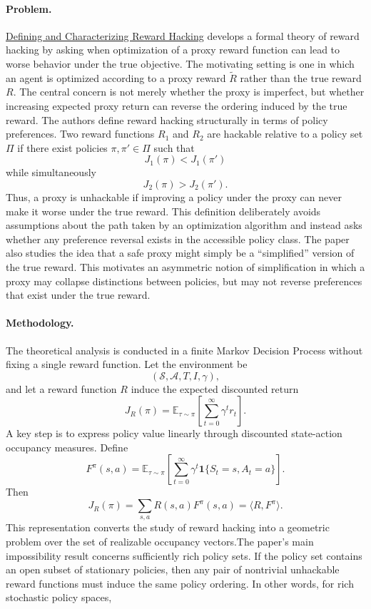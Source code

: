 \documentclass[11pt]{article}
\begin{document}
\paragraph{Problem.}
\href{https://arxiv.org/pdf/2209.13085}{Defining and Characterizing Reward Hacking} develops a formal theory of reward hacking by asking when optimization of a proxy reward function can lead to worse behavior under the true objective. The motivating setting is one in which an agent is optimized according to a proxy reward $\tilde{R}$ rather than the true reward $R$. The central concern is not merely whether the proxy is imperfect, but whether increasing expected proxy return can reverse the ordering induced by the true reward.
The authors define reward hacking structurally in terms of policy preferences. Two reward functions $R_1$ and $R_2$ are hackable relative to a policy set $\Pi$ if there exist policies $\pi,\pi' \in \Pi$ such that
\[
J_1(\pi) < J_1(\pi')
\]
while simultaneously
\[
J_2(\pi) > J_2(\pi').
\]
Thus, a proxy is unhackable if improving a policy under the proxy can never make it worse under the true reward. This definition deliberately avoids assumptions about the path taken by an optimization algorithm and instead asks whether any preference reversal exists in the accessible policy class.
The paper also studies the idea that a safe proxy might simply be a ``simplified'' version of the true reward. This motivates an asymmetric notion of simplification in which a proxy may collapse distinctions between policies, but may not reverse preferences that exist under the true reward.

\paragraph{Methodology.}
The theoretical analysis is conducted in a finite Markov Decision Process without fixing a single reward function. Let the environment be
\[
(\mathcal{S},\mathcal{A},T,I,\gamma),
\]
and let a reward function $R$ induce the expected discounted return
\[
J_R(\pi)
=
\mathbb{E}_{\tau\sim\pi}
\left[
\sum_{t=0}^{\infty}\gamma^t r_t
\right].
\]
A key step is to express policy value linearly through discounted state-action occupancy measures. Define
\[
F^\pi(s,a)
=
\mathbb{E}_{\tau\sim\pi}
\left[
\sum_{t=0}^{\infty}
\gamma^t
\mathbf{1}\{S_t=s,A_t=a\}
\right].
\]
Then
\[
J_R(\pi)
=
\sum_{s,a}
R(s,a)F^\pi(s,a)
=
\langle R,F^\pi\rangle.
\]
This representation converts the study of reward hacking into a geometric problem over the set of realizable occupancy vectors.The paper's main impossibility result concerns sufficiently rich policy sets. If the policy set contains an open subset of stationary policies, then any pair of nontrivial unhackable reward functions must induce the same policy ordering. In other words, for rich stochastic policy spaces,
\end{document}
